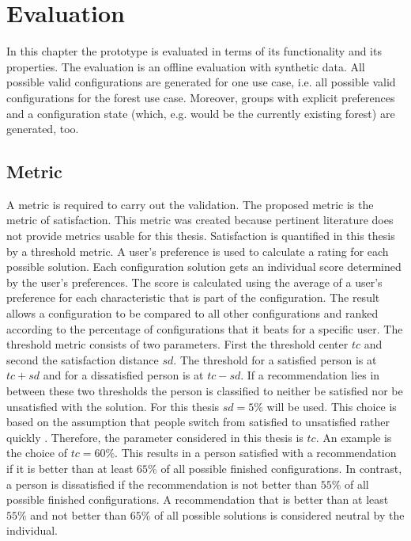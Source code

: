 \chapter{Evaluation}
\label{ch:Evaluation}

In this chapter the prototype is evaluated in terms of its functionality and its properties. The evaluation is an offline evaluation with synthetic data. All possible valid configurations are generated for one use case, i.e. all possible valid configurations for the forest use case. Moreover, groups with explicit preferences and a configuration state (which, e.g. would be the currently existing forest) are generated, too.

\section{Metric}
\label{sec:Evaluation:Metrics}

A metric is required to carry out the validation. The proposed metric is the metric of satisfaction. This metric was created because pertinent literature does not provide metrics usable for this thesis. Satisfaction is quantified in this thesis by a threshold metric. A user's preference is used to calculate a rating for each possible solution. Each configuration solution gets an individual score determined by the user's preferences. The score is calculated using the average of a user's preference for each characteristic that is part of the configuration. The result allows a configuration to be compared to all other configurations and ranked according to the percentage of configurations that it beats for a specific user. The threshold metric consists of two parameters. First the threshold center $tc$ and second the satisfaction distance $sd$. The threshold for a satisfied person is at $tc + sd$ and for a dissatisfied person is at $tc - sd$. If a recommendation lies in between these two thresholds the person is classified to neither be satisfied nor be unsatisfied with the solution. For this thesis $sd=5\%$ will be used. This choice is based on the assumption that people switch from satisfied to unsatisfied rather quickly . Therefore, the parameter considered in this thesis is $tc$. An example is the choice of $tc = 60\%$. This results in a person satisfied with a recommendation if it is better than at least $65\%$ of all possible finished configurations. In contrast, a person is dissatisfied if the recommendation is not better than $55\%$ of all possible finished configurations. A recommendation that is better than at least $55\%$ and not better than $65\%$ of all possible solutions is considered neutral by the individual.

